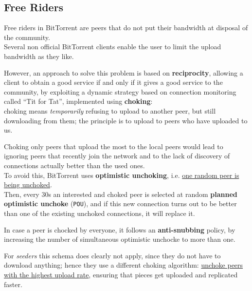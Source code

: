 \subsection{Free Riders}
Free riders in BitTorrent are peers that do not put their bandwidth at disposal of the community.\\
Several non official BitTorrent clients enable the user to limit the upload bandwidth as they like.

However, an approach to solve this problem is based on \textbf{reciprocity}, allowing a client to obtain a good service if and only if it gives a good service to the community, by exploiting a dynamic strategy based on connection monitoring called ``Tit for Tat'', implemented using \textbf{choking}:\\
choking means \textit{temporarily} refusing to upload to another peer, but still downloading from them;  
the principle is to upload to peers who have uploaded to us.


Choking only peers that upload the most to the local peers would lead to ignoring peers that recently join the network
and to the lack of discovery of connections actually better than the used ones.\\
To avoid this, BitTorrent uses \textbf{optimistic unchoking}, i.e. \ul{one random peer is being unchoked}.\\
Then, every 30s an interested and choked peer is selected at random \textbf{planned optimistic unchoke} (\texttt{POU}), and if this new connection turns out to be better than one of the existing
unchoked connections, it will replace it.

In case a peer is chocked by everyone, it follows an \textbf{anti-snubbing} policy, by increasing the number of simultaneous optimistic
unchocke to more than one.

For \textit{seeders} this schema does clearly not apply, since they do not have to download anything; hence they use a different choking algorithm:
\ul{unchoke peers with the highest upload rate}, ensuring that pieces get uploaded and replicated faster.

